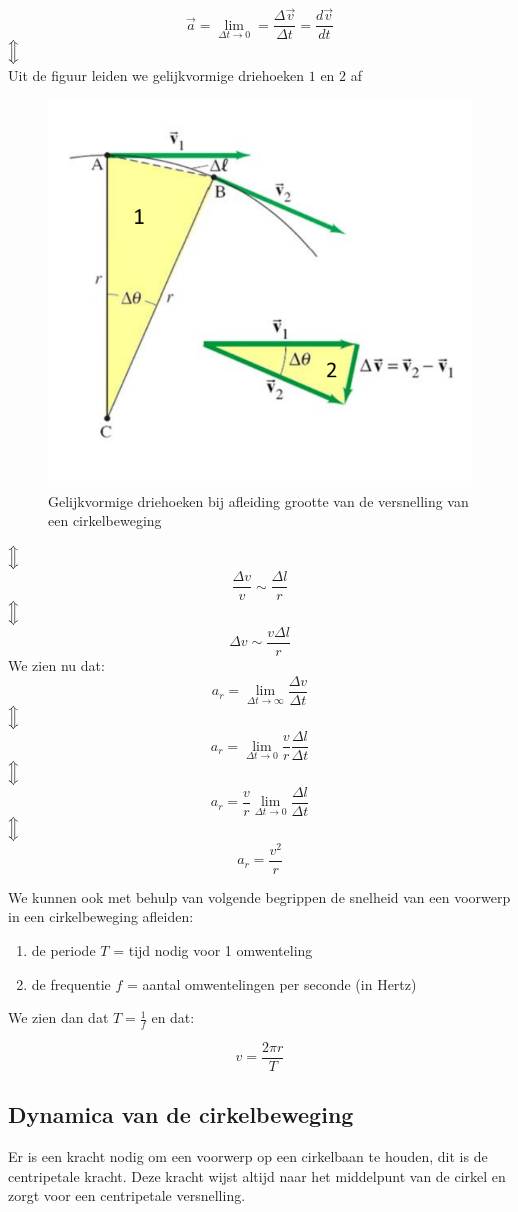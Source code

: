 \documentclass[12pt,a4paper]{article}
\newcommand{\Luda}{\Big\Updownarrow}
\begin{document}
    \begin{center}
    	\[\vec{a} = \lim_{\Delta t \to 0} = \frac{\Delta \vec{v}}{\Delta t} = \frac{d\vec{v}}{dt}\]
    	$\Luda$\\ Uit de figuur leiden we gelijkvormige driehoeken $1$ en $2$ af
	    	\begin{figure}[h]
	        		\centering
	       		 \includegraphics[width=0.6\linewidth]{cirkel}
	       		 \caption{Gelijkvormige driehoeken bij afleiding grootte van de versnelling van een cirkelbeweging}
	        		\label{cirkel}
	    	\end{figure}
	$\Luda$\[\frac{\Delta v}{v} \sim \frac{\Delta l}{r}\]
	$\Luda$\[\Delta v \sim \frac{v\Delta l}{r}\]	    	
	We zien nu dat:
	\[a_{r} = \lim_{\Delta t\to\infty} \frac{\Delta v}{\Delta t}\]
	$\Luda$\[a_{r} = \lim_{\Delta t \to 0} \frac{v}{r}\frac{\Delta l}{\Delta t}\]
	$\Luda$\[a_{r} = \frac{v}{r} \lim_{\Delta t \to 0} \frac{\Delta l}{\Delta t}\]
	$\Luda$\[a_{r} = \frac{v^{2}}{r}\]
    \end{center}
    
    We kunnen ook met behulp van volgende begrippen de snelheid van een voorwerp in een cirkelbeweging afleiden:
    \begin{enumerate}
    	\item de periode $T$ = tijd nodig voor 1 omwenteling
    	\item de frequentie $f$ = aantal omwentelingen per seconde (in Hertz)
    \end{enumerate}
    
    We zien dan dat $T = \frac{1}{f}$ en dat:
    
    \begin{center}
    	\[v = \frac{2\pi r}{T}\]	
    \end{center}
    
    \subsection{Dynamica van de cirkelbeweging}
    Er is een kracht nodig om een voorwerp op een cirkelbaan te houden, dit is de centripetale kracht. Deze kracht wijst altijd naar het middelpunt
    van de cirkel en zorgt voor een centripetale versnelling. 
    
\end{document}
